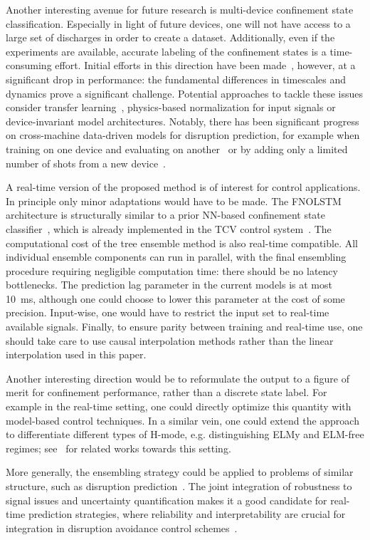 Another interesting avenue for future research is multi-device confinement state classification. Especially in light of future devices, one will not have access to a large set of discharges in order to create a dataset. Additionally, even if the experiments are available, accurate labeling of the confinement states is a time-consuming effort. Initial efforts in this direction have been made~\cite{marceca2021}, however, at a significant drop in performance: the fundamental differences in timescales and dynamics prove a significant challenge. Potential approaches to tackle these issues consider transfer learning~\cite{zhuang2021transfer}, physics-based normalization for input signals or device-invariant model architectures. Notably, there has been significant progress on cross-machine data-driven models for disruption prediction, for example when training on one device and evaluating on another~\cite{katesharbeck2019} or by adding only a limited number of shots from a new device~\cite{zhu021disr,zheng2023disr}.




A real-time version of the proposed method is of interest for control applications. In principle only minor adaptations would have to be made. The FNOLSTM architecture is structurally similar to a prior NN-based confinement state classifier~\cite{matoslhd2020}, which is already implemented in the TCV control system~\cite{marceca2021,galperti2024}. The computational cost of the tree ensemble method is also real-time compatible. All individual ensemble components can run in parallel, with the final ensembling procedure requiring negligible computation time: there should be no latency bottlenecks. The prediction lag parameter in the current models is at most \SI{10}{\milli\second}, although one could choose to lower this parameter at the cost of some precision. Input-wise, one would have to restrict the input set to real-time available signals. Finally, to ensure parity between training and real-time use, one should take care to use causal interpolation methods rather than the linear interpolation used in this paper.

Another interesting direction would be to reformulate the output to a figure of merit for confinement performance, rather than a discrete state label. For example in the real-time setting, one could directly optimize this quantity with model-based control techniques. In a similar vein, one could extend the approach to differentiate different types of H-mode, e.g. distinguishing ELMy and ELM-free regimes; see~\cite{zorek2022,gill2024} for related works towards this setting.

More generally, the ensembling strategy could be applied to problems of similar structure, such as disruption prediction~\cite{katesharbeck2019}. The joint integration of robustness to signal issues and uncertainty quantification makes it a good candidate for real-time prediction strategies, where reliability and interpretability are crucial for integration in disruption avoidance control schemes~\cite{galperti2024}.
